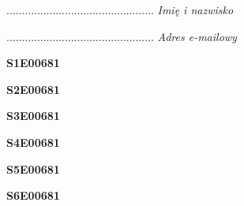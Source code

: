 \begin{turn}{90}\begin{minipage}{\linewidth} \vspace{20mm} ................................................  \textit{Imię i nazwisko}\end{minipage}\end{turn}

\begin{turn}{90}\begin{minipage}{\linewidth} \vspace{20mm} ................................................  \textit{Adres e-mailowy}\end{minipage}\end{turn}

\begin{turn}{90}\huge \begin{minipage}{\linewidth} \vspace{10mm}\textbf{S1E00681}\end{minipage}\end{turn}

\begin{turn}{90}\huge \begin{minipage}{\linewidth} \vspace{10mm}\textbf{S2E00681}\end{minipage}\end{turn}

\begin{turn}{90}\huge \begin{minipage}{\linewidth} \vspace{10mm}\textbf{S3E00681}\end{minipage}\end{turn}

\begin{turn}{90}\huge \begin{minipage}{\linewidth} \vspace{10mm}\textbf{S4E00681}\end{minipage}\end{turn}

\begin{turn}{90}\huge \begin{minipage}{\linewidth} \vspace{10mm}\textbf{S5E00681}\end{minipage}\end{turn}

\begin{turn}{90}\huge \begin{minipage}{\linewidth} \vspace{10mm}\textbf{S6E00681}\end{minipage}\end{turn}

